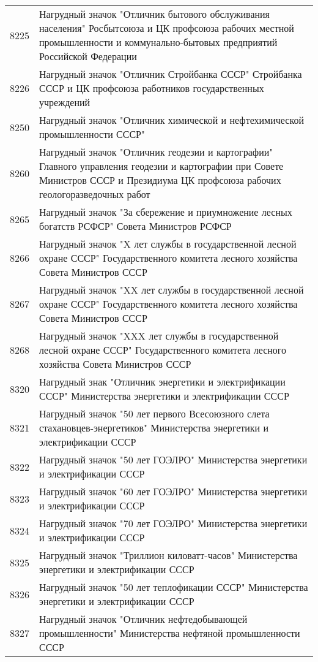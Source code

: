 \documentclass[10pt, a4paper, titlepage]{article}
\begin{document}
\begin{center}
\begin{longtable}{rp{}}
        8225 & Нагрудный значок "Отличник бытового обслуживания населения" Росбытсоюза и ЦК профсоюза рабочих местной промышленности и коммунально-бытовых предприятий Российской Федерации \\
        8226 & Нагрудный значок "Отличник Стройбанка СССР" Стройбанка СССР и ЦК профсоюза работников государственных учреждений \\
        8250 & Нагрудный значок "Отличник химической и нефтехимической промышленности СССР" \\
        8260 & Нагрудный значок "Отличник геодезии и картографии" Главного управления геодезии и картографии при Совете Министров СССР и Президиума ЦК профсоюза рабочих геологоразведочных работ \\
        8265 & Нагрудный значок "За сбережение и приумножение лесных богатств РСФСР" Совета Министров РСФСР \\
        8266 & Нагрудный значок "X лет службы в государственной лесной охране СССР" Государственного комитета лесного хозяйства Совета Министров СССР \\
        8267 & Нагрудный значок "XX лет службы в государственной лесной охране СССР" Государственного комитета лесного хозяйства Совета Министров СССР \\
        8268 & Нагрудный значок "XXX лет службы в государственной лесной охране СССР" Государственного комитета лесного хозяйства Совета Министров СССР \\
        8320 & Нагрудный знак "Отличник энергетики и электрификации СССР" Министерства энергетики и электрификации СССР \\
        8321 & Нагрудный значок "50 лет первого Всесоюзного слета стахановцев-энергетиков" Министерства энергетики и электрификации СССР \\
        8322 & Нагрудный значок "50 лет ГОЭЛРО" Министерства энергетики и электрификации СССР \\
        8323 & Нагрудный значок "60 лет ГОЭЛРО" Министерства энергетики и электрификации СССР \\
        8324 & Нагрудный значок "70 лет ГОЭЛРО" Министерства энергетики и электрификации СССР \\
        8325 & Нагрудный значок "Триллион киловатт-часов" Министерства энергетики и электрификации СССР \\
        8326 & Нагрудный значок "50 лет теплофикации СССР" Министерства энергетики и электрификации СССР \\
        8327 & Нагрудный значок "Отличник нефтедобывающей промышленности" Министерства нефтяной промышленности СССР \\

\end{longtable}
\end{center}
\end{document}

